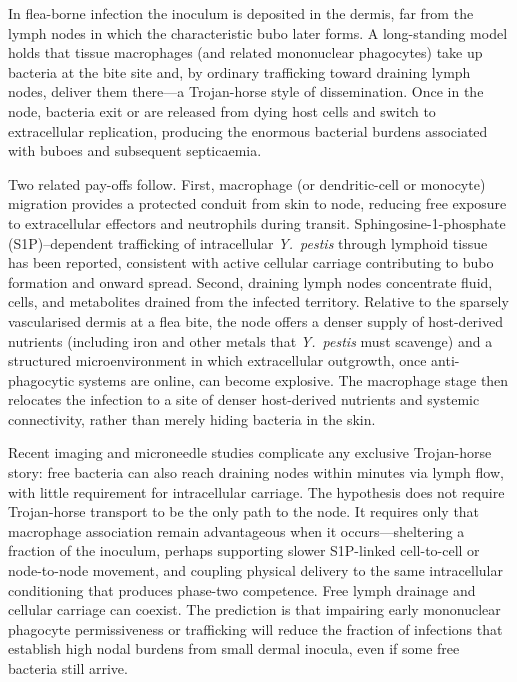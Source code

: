 \documentclass[11pt,a4paper]{article}
\begin{document}
In flea-borne infection the inoculum is deposited in the dermis, far from the lymph nodes in which the characteristic bubo later forms. A long-standing model holds that tissue macrophages (and related mononuclear phagocytes) take up bacteria at the bite site and, by ordinary trafficking toward draining lymph nodes, deliver them there---a Trojan-horse style of dissemination. Once in the node, bacteria exit or are released from dying host cells and switch to extracellular replication, producing the enormous bacterial burdens associated with buboes and subsequent septicaemia.

Two related pay-offs follow. First, macrophage (or dendritic-cell or monocyte) migration provides a protected conduit from skin to node, reducing free exposure to extracellular effectors and neutrophils during transit. Sphingosine-1-phosphate (S1P)--dependent trafficking of intracellular \textit{Y.\ pestis} through lymphoid tissue has been reported, consistent with active cellular carriage contributing to bubo formation and onward spread. Second, draining lymph nodes concentrate fluid, cells, and metabolites drained from the infected territory. Relative to the sparsely vascularised dermis at a flea bite, the node offers a denser supply of host-derived nutrients (including iron and other metals that \textit{Y.\ pestis} must scavenge) and a structured microenvironment in which extracellular outgrowth, once anti-phagocytic systems are online, can become explosive. The macrophage stage then relocates the infection to a site of denser host-derived nutrients and systemic connectivity, rather than merely hiding bacteria in the skin.

Recent imaging and microneedle studies complicate any exclusive Trojan-horse story: free bacteria can also reach draining nodes within minutes via lymph flow, with little requirement for intracellular carriage. The hypothesis does not require Trojan-horse transport to be the only path to the node. It requires only that macrophage association remain advantageous when it occurs---sheltering a fraction of the inoculum, perhaps supporting slower S1P-linked cell-to-cell or node-to-node movement, and coupling physical delivery to the same intracellular conditioning that produces phase-two competence. Free lymph drainage and cellular carriage can coexist. The prediction is that impairing early mononuclear phagocyte permissiveness or trafficking will reduce the fraction of infections that establish high nodal burdens from small dermal inocula, even if some free bacteria still arrive.
\end{document}

